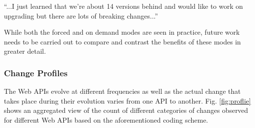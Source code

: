 \documentclass[conference]{IEEEtran}
\begin{document}
\small
``...I just learned that we're about 14 versions behind and would like to work on upgrading but there are lots of breaking changes...''
\normalsize

While both the forced and on demand modes are seen in practice, future work needs to be carried out to compare and contrast the benefits of these modes in greater detail.

\subsubsection{Change Profiles}
The Web APIs evolve at different frequencies as well as the actual change that takes place during their evolution varies from one API to another. Fig. \ref{fig:proflie} shows an aggregated view of the count of different categories of changes observed for different Web APIs based on the aforementioned coding scheme.
\end{document}
